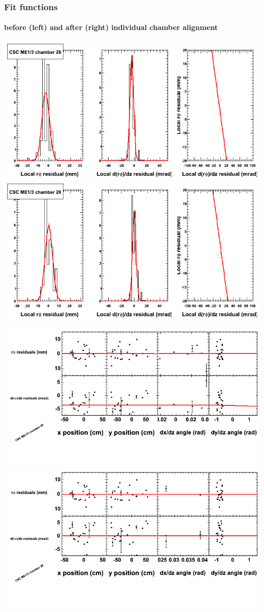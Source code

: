 \documentclass[compress]{beamer}
\begin{document}
\begin{frame}
\frametitle{Fit functions}
\framesubtitle{before (left) and after (right) individual chamber alignment}
\includegraphics[width=0.5\linewidth]{ringfits_3dof/beforefit_MEp13_28_bellcurve.png} \includegraphics[width=0.5\linewidth]{ringfits_3dof/afterfit_MEp13_28_bellcurve.png}

\includegraphics[width=0.5\linewidth]{ringfits_3dof/beforefit_MEp13_28_polynomials.png} \includegraphics[width=0.5\linewidth]{ringfits_3dof/afterfit_MEp13_28_polynomials.png}
\end{frame}
\end{document}
